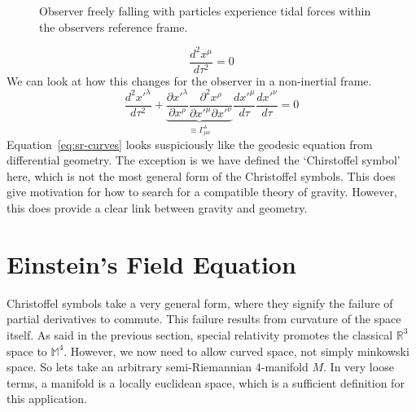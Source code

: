 \begin{figure}
    \centering
    \caption{Observer freely falling with particles experience tidal forces within the observers reference frame.}
\end{figure}
\begin{equation}
    \frac{d^2x^\mu}{d\tau^2} = 0
\end{equation} 
We can look at how this changes for the observer in a non-inertial frame.
\begin{equation}\label{eq:sr-curves}
    \frac{d^2x'^\lambda}{d\tau^2}+\underbrace{\frac{\partial x'^\lambda}{\partial x^\rho}\frac{\partial^2 x^\rho}{\partial x'^\mu \partial x'^\nu}}_{\equiv \Gamma_{\mu\nu}^\lambda} \frac{d x'^\mu}{d \tau} \frac{d x'^\nu}{d \tau} = 0
\end{equation}
Equation~\ref{eq:sr-curves} looks suspiciously like the geodesic equation from differential geometry. The exception is we have defined the `Chirstoffel symbol' here, which is not the most general form of the Christoffel symbols. This does give motivation for how to search for a compatible theory of gravity. However, this does provide a clear link between gravity and geometry. 
\section{Einstein's Field Equation}
Christoffel symbols take a very general form, where they signify the failure of partial derivatives to commute. This failure results from curvature of the space itself. As said in the previous section, special relativity promotes the classical $\mathbb{R}^3$ space to $\mathbb{M}^4$. However, we now need to allow curved space, not simply minkowski space. So lets take an arbitrary semi-Riemannian 4-manifold $M$. In very loose terms, a manifold is a locally euclidean space, which is a sufficient definition for this application.

